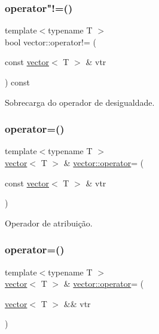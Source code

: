 \subsubsection{\texorpdfstring{operator"!=()}{operator!=()}}
{\footnotesize\ttfamily template$<$typename T $>$ \\
bool vector\+::operator!= (\begin{DoxyParamCaption}\item[{const \hyperlink{classsc_1_1vector}{vector}$<$ T $>$ \&}]{vtr }\end{DoxyParamCaption}) const}



Sobrecarga do operador de desigualdade. 

\mbox{\label{classsc_1_1vector_aa39c1f22582a429142479349a40cbbb7}} 
\subsubsection{\texorpdfstring{operator=()}{operator=()}\hspace{0.1cm}{\footnotesize\ttfamily [1/2]}}
{\footnotesize\ttfamily template$<$typename T $>$ \\
\hyperlink{classsc_1_1vector}{vector}$<$ T $>$ \& \hyperlink{classsc_1_1vector_a889e37c4415a33fb90d8b564bf428e24}{vector\+::operator}= (\begin{DoxyParamCaption}\item[{const \hyperlink{classsc_1_1vector}{vector}$<$ T $>$ \&}]{vtr }\end{DoxyParamCaption})}



Operador de atribuição. 

\mbox{\label{classsc_1_1vector_a8d6fa43cf97edad41fe82e4c91b3d064}} 
\subsubsection{\texorpdfstring{operator=()}{operator=()}\hspace{0.1cm}{\footnotesize\ttfamily [2/2]}}
{\footnotesize\ttfamily template$<$typename T $>$ \\
\hyperlink{classsc_1_1vector}{vector}$<$ T $>$ \& \hyperlink{classsc_1_1vector_a889e37c4415a33fb90d8b564bf428e24}{vector\+::operator}= (\begin{DoxyParamCaption}\item[{\hyperlink{classsc_1_1vector}{vector}$<$ T $>$ \&\&}]{vtr }\end{DoxyParamCaption})}



